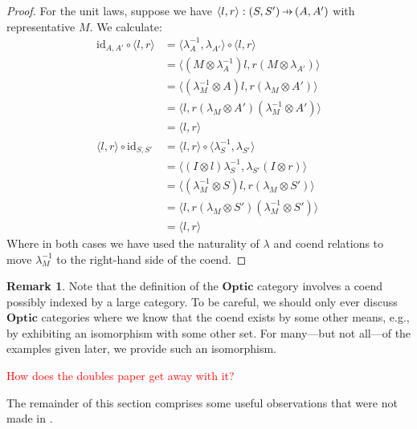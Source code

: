 \documentclass[11pt,a4paper]{article}
\theoremstyle{plain}
\theoremstyle{definition}
\newtheorem{remark}[theorem]{Remark}
\newcommand{\Optic}{\mathbf{Optic}}
\newcommand{\id}{\mathrm{id}}
\newcommand{\hto}{\ensuremath{\,\mathaccent\shortmid\rightarrow\,}}
\newcommand{\todo}[1]{\textcolor{red}{\small #1}}
\begin{document}
\begin{proof}
For the unit laws, suppose we have $\langle l, r \rangle : (S, S') \hto (A, A')$ with representative $M$. We calculate:
\begin{align*}
\id_{A, A'} \circ \langle l, r\rangle 
&= \langle \lambda^{-1}_A, \lambda_{A'} \rangle \circ \langle l, r\rangle \\
&= \langle (M \otimes \lambda^{-1}_A) l, r (M\otimes  \lambda_{A'})\rangle \\
&= \langle (\lambda^{-1}_M \otimes  A) l, r (\lambda_M \otimes A')\rangle \\
&= \langle l, r (\lambda_M \otimes A') (\lambda^{-1}_M \otimes A')\rangle \\
&= \langle l, r \rangle  \\
\langle l, r \rangle \circ \id_{S, S'} 
&= \langle l, r \rangle \circ \langle \lambda^{-1}_S, \lambda_{S'}\rangle  \\
&= \langle (I \otimes l)\lambda^{-1}_S, \lambda_{S'} (I \otimes r) \rangle \\
&= \langle (\lambda^{-1}_M \otimes S)l, r (\lambda_{M} \otimes S') \rangle \\
&= \langle l, r (\lambda_{M} \otimes S')(\lambda^{-1}_M \otimes S') \rangle \\
&= \langle l, r \rangle
\end{align*}
Where in both cases we have used the naturality of $\lambda$ and coend relations to move $\lambda^{-1}_M$ to the right-hand side of the coend. 
\end{proof}

\begin{remark}
Note that the definition of the $\Optic$ category involves a coend possibly indexed by a large category. To be careful, we should only ever discuss $\Optic$ categories where we know that the coend exists by some other means, e.g., by exhibiting an isomorphism with some other set. For many---but not all---of the examples given later, we provide such an isomorphism.

\todo{How does the doubles paper get away with it?}
\end{remark}

The remainder of this section comprises some useful observations that were not made in \cite{Doubles}.
\end{document}

